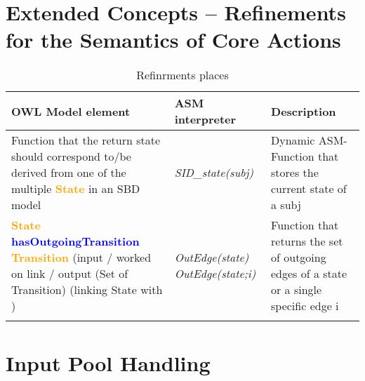 \section{Extended Concepts  – Refinements for the Semantics of Core Actions}

\begin{landscape}
	\begin {longtable} {| p{} | p{} | p{}|}
	\hline
	OWL Model element &   ASM interpreter & Description\\
	\toprule
	\endhead
	\hline
	
	Function that the return state should correspond to/be derived from one of the multiple \textcolor{orange}{\textbf{State }}in an SBD model
	& \textit{SID\_state(subj)} 
	&  Dynamic ASM-Function that stores the current state of a subj
	\\
	\hline
	
	\textcolor{orange}{\textbf{State }} \textcolor{blue}{\textbf{hasOutgoingTransition }} \textcolor{orange}{\textbf{Transition }}  \newline
	(input / worked on link  / output (Set of Transition)
	(linking State with )
	& \textit{OutEdge(state) \newline
		OutEdge(state;i)}
	& Function that returns the set of outgoing edges of a state or a single specific edge i
	\\
	\hline
	\caption{Refinrments places}
\label{tab:Refinrments places}
\end{longtable}
\end {landscape}


\section{Input Pool Handling}


